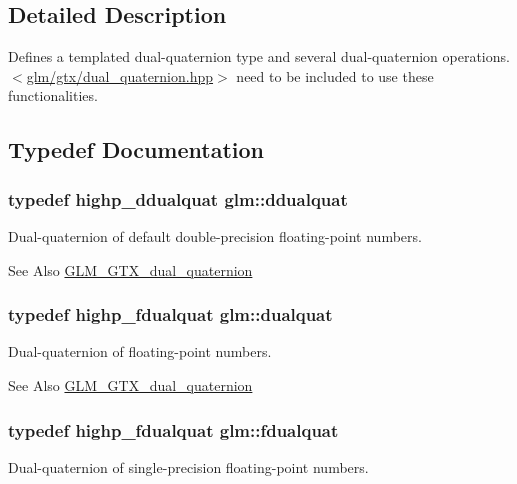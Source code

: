 \subsection{Detailed Description}
Defines a templated dual-\/quaternion type and several dual-\/quaternion operations. $<$\hyperlink{dual__quaternion_8hpp}{glm/gtx/dual\-\_\-quaternion.\-hpp}$>$ need to be included to use these functionalities. 

\subsection{Typedef Documentation}
\hypertarget{group__gtc__dual__quaternion_ga373431ffdd82d5c03c258217a9e1f1a6}{
\subsubsection[{ddualquat}]{\setlength{\rightskip}{0pt plus 5cm}typedef highp\-\_\-ddualquat {\bf glm\-::ddualquat}}}\label{group__gtc__dual__quaternion_ga373431ffdd82d5c03c258217a9e1f1a6}
Dual-\/quaternion of default double-\/precision floating-\/point numbers.

\begin{DoxySeeAlso}{See Also}
\hyperlink{group__gtc__dual__quaternion}{G\-L\-M\-\_\-\-G\-T\-X\-\_\-dual\-\_\-quaternion} 
\end{DoxySeeAlso}
\hypertarget{group__gtc__dual__quaternion_ga2f6227b5f9dc08a2e7682065a84b3aa9}{
\subsubsection[{dualquat}]{\setlength{\rightskip}{0pt plus 5cm}typedef highp\-\_\-fdualquat {\bf glm\-::dualquat}}}\label{group__gtc__dual__quaternion_ga2f6227b5f9dc08a2e7682065a84b3aa9}
Dual-\/quaternion of floating-\/point numbers.

\begin{DoxySeeAlso}{See Also}
\hyperlink{group__gtc__dual__quaternion}{G\-L\-M\-\_\-\-G\-T\-X\-\_\-dual\-\_\-quaternion} 
\end{DoxySeeAlso}
\hypertarget{group__gtc__dual__quaternion_ga436906129bc69ca5059555cafcbac9fd}{
\subsubsection[{fdualquat}]{\setlength{\rightskip}{0pt plus 5cm}typedef highp\-\_\-fdualquat {\bf glm\-::fdualquat}}}\label{group__gtc__dual__quaternion_ga436906129bc69ca5059555cafcbac9fd}
Dual-\/quaternion of single-\/precision floating-\/point numbers.

